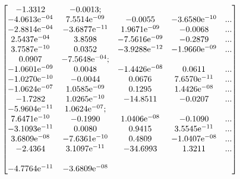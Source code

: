 \begin{equation*}
\begin{bmatrix}
-1.3312 & -0.0013; & & \\ 
-4.0613\mathrm{e}^{-04} & 7.5514\mathrm{e}^{-09} & -0.0055 & -3.6580\mathrm{e}^{-10} & ... \\
-2.8814\mathrm{e}^{-04} & -3.6877\mathrm{e}^{-11} & 1.9671\mathrm{e}^{-09} & -0.0068 & ... \\
2.5437\mathrm{e}^{-04} & 3.8598 & -7.5616\mathrm{e}^{-09} & -0.2879 & ... \\
3.7587\mathrm{e}^{-10} & 0.0352 & -3.9288\mathrm{e}^{-12} & -1.9660\mathrm{e}^{-09} & ... \\
0.0907 & -7.5648\mathrm{e}^{-04}; & & \\ 
-1.0601\mathrm{e}^{-09} & 0.0048 & -1.4426\mathrm{e}^{-08} & 0.0611 & ... \\
-1.0270\mathrm{e}^{-10} & -0.0044 & 0.0676 & 7.6570\mathrm{e}^{-11} & ... \\
-1.0624\mathrm{e}^{-07} & 1.0585\mathrm{e}^{-09} & 0.1295 & 1.4426\mathrm{e}^{-08} & ... \\
-1.7282 & 1.0265\mathrm{e}^{-10} & -14.8511 & -0.0207 & ... \\
-5.9604\mathrm{e}^{-11} & 1.0624\mathrm{e}^{-07}; & & \\ 
7.6471\mathrm{e}^{-10} & -0.1990 & 1.0406\mathrm{e}^{-08} & -0.1090 & ... \\
-3.1093\mathrm{e}^{-11} & 0.0080 & 0.9415 & 3.5545\mathrm{e}^{-11} & ... \\
3.6809\mathrm{e}^{-08} & -7.6361\mathrm{e}^{-10} & 0.4809 & -1.0407\mathrm{e}^{-08} & ... \\
-2.4364 & 3.1097\mathrm{e}^{-11} & -34.6993 & 1.3211 & ... \\\\
-4.7764\mathrm{e}^{-11} & -3.6809\mathrm{e}^{-08} & &
\end{bmatrix}
\end{equation*}